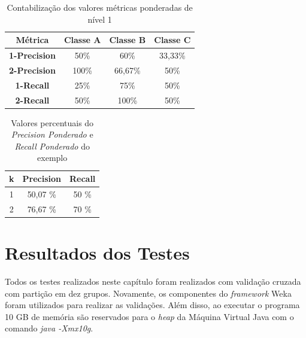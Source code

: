 \begin{table}[h!]
  \begin{center}
    \begin{tabular}{cccc}
      \hline
       Métrica  & \textbf{Classe A} & \textbf{Classe B} & \textbf{Classe C} \\
      \hline

      \textbf{1-Precision} & 50\% & 60\% & 33,33\% \\
      \textbf{2-Precision} & 100\% & 66,67\% & 50\% \\
      \textbf{1-Recall} & 25\% & 75\% & 50\% \\
      \textbf{2-Recall} & 50\% & 100\% & 50\% \\
      
      \hline
    \end{tabular}
    \caption{Contabilização dos valores métricas ponderadas de nível 1}
    \label{tab:valores_classes}
  \end{center}
\end{table}

\begin{table}[h!]
  \begin{center}
    \begin{tabular}{ccc}
      \hline
      \textbf{k} & \textbf{Precision} & \textbf{Recall} \\
      \hline

      1 & 50,07 \% & 50 \% \\
      2 & 76,67 \% & 70 \% \\

      \hline
    \end{tabular}
    \caption{Valores percentuais do \textit{Precision Ponderado} e \textit{Recall Ponderado} do exemplo}
    \label{tab:valores_pon}
  \end{center}
\end{table}

\section{Resultados dos Testes}

Todos os testes realizados neste capítulo foram realizados com validação cruzada com partição em dez grupos.
Novamente, os componentes do \textit{framework} Weka foram utilizados para realizar as validações.
Além disso, ao executar o programa 10 GB de memória são reservados para o \textit{heap} da Máquina Virtual Java com o comando \textit{java -Xmx10g}.


